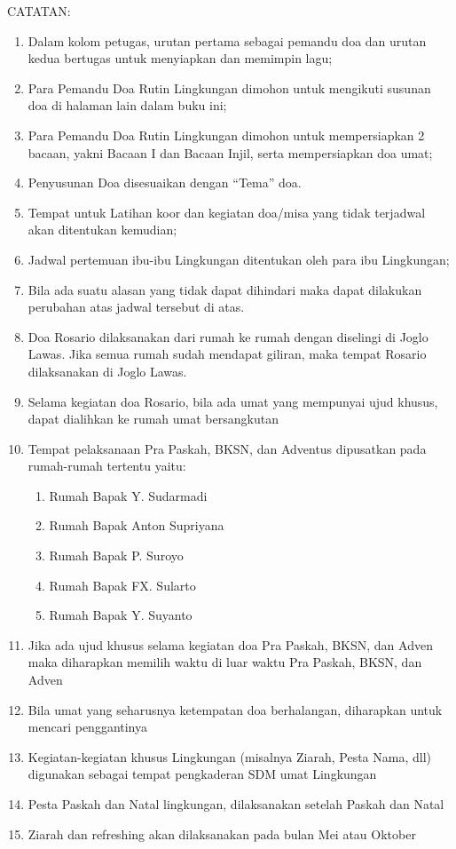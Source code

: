 CATATAN:

\begin{enumerate}
\item Dalam kolom petugas,   urutan pertama sebagai pemandu doa dan urutan
kedua bertugas untuk menyiapkan dan memimpin lagu; 
\item Para Pemandu Doa Rutin Lingkungan dimohon untuk mengikuti susunan
doa di halaman lain dalam buku ini; 
\item Para Pemandu Doa Rutin Lingkungan dimohon untuk mempersiapkan 2
bacaan,   yakni Bacaan I dan Bacaan Injil,   serta mempersiapkan doa umat; 
\item Penyusunan Doa disesuaikan dengan
{\textquotedblleft}Tema{\textquotedblright} doa. 
\item Tempat untuk Latihan koor dan kegiatan doa/misa yang tidak
terjadwal akan ditentukan kemudian; 
\item Jadwal pertemuan ibu-ibu Lingkungan ditentukan oleh para ibu
Lingkungan; 
\item Bila ada suatu alasan yang tidak dapat dihindari maka dapat
dilakukan perubahan atas jadwal tersebut di atas. 
\item Doa Rosario dilaksanakan dari rumah ke rumah dengan diselingi di Joglo Lawas. Jika semua rumah sudah mendapat giliran,   maka tempat Rosario dilaksanakan di Joglo Lawas.
\item Selama kegiatan doa Rosario,   bila ada umat yang mempunyai ujud khusus,   dapat dialihkan ke rumah umat bersangkutan
\item Tempat pelaksanaan Pra Paskah,   BKSN,   dan Adventus dipusatkan pada rumah-rumah tertentu yaitu:  
\begin{enumerate}
\item Rumah Bapak Y. Sudarmadi
\item Rumah Bapak Anton Supriyana
\item Rumah Bapak P. Suroyo
\item Rumah Bapak FX. Sularto
\item Rumah Bapak Y. Suyanto
\end{enumerate}

\item Jika ada ujud khusus selama kegiatan doa Pra Paskah,   BKSN,   dan Adven maka diharapkan memilih waktu di luar waktu Pra Paskah,   BKSN,   dan Adven
\item Bila umat yang seharusnya ketempatan doa berhalangan,   diharapkan untuk
mencari penggantinya
\item Kegiatan-kegiatan khusus Lingkungan (misalnya Ziarah,   Pesta Nama,   dll) digunakan sebagai tempat pengkaderan SDM umat Lingkungan 
\item Pesta Paskah dan Natal lingkungan,   dilaksanakan setelah Paskah dan Natal
\item Ziarah dan refreshing akan dilaksanakan pada bulan Mei atau Oktober
\end{enumerate}

\newpage
